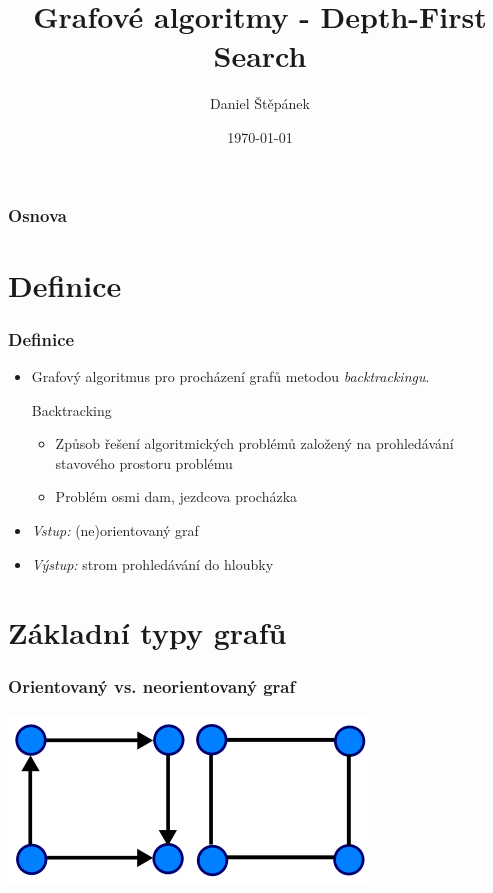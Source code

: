 \documentclass[10pt, hyperref={unicode}]{beamer}
\title{Grafové algoritmy - Depth-First Search}
\author{Daniel Štěpánek}
\institute[FIT VUT]{Fakulta informačních technologií VUT Brno}
\date{\today}
\begin{document}
\begin{frame}
	\titlepage
\end{frame}

\begin{frame}
	\frametitle{Osnova}
	\tableofcontents
\end{frame}


\section{Definice}
\begin{frame}
	\frametitle{Definice}
	\begin{itemize}
  		\item Grafový algoritmus pro procházení grafů metodou \emph{backtrackingu}.
  		\begin{block}{Backtracking}
			\begin{itemize}
				\item Způsob řešení algoritmických problémů založený na prohledávání stavového prostoru problému
				\item Problém osmi dam, jezdcova procházka
			\end{itemize}			    					
  		\end{block}
  		\item \emph{Vstup:} (ne)orientovaný graf
  		\item \emph{Výstup:} strom prohledávání do hloubky
	\end{itemize}
\end{frame}

\section{Základní typy grafů}
\begin{frame}
	\frametitle{Orientovaný vs. neorientovaný graf}
	\includegraphics[scale=0.75]{img/or_vs_neor.png}
\end{frame}
\end{document}
